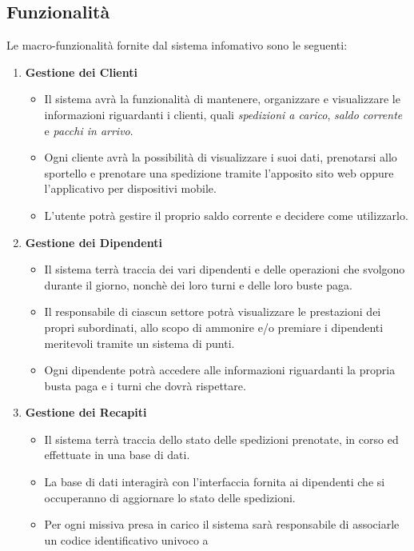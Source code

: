 \documentclass[a4paper,12pt]{article}
\begin{document}
\subsection{Funzionalità}
Le macro-funzionalità fornite dal sistema infomativo sono le seguenti:
\begin{enumerate}
	\item \textbf{Gestione dei Clienti} \begin{itemize}
		      \item Il sistema avrà la funzionalità di mantenere, organizzare e visualizzare le informazioni riguardanti i clienti, 
            quali \textit{spedizioni a carico}, \textit{saldo corrente} e \textit{pacchi in arrivo}.
		      \item Ogni cliente avrà la possibilità di visualizzare i suoi dati, prenotarsi allo sportello e prenotare una spedizione 
            tramite l'apposito sito web oppure l'applicativo per dispositivi mobile.
		      \item L'utente potrà gestire il proprio saldo corrente e decidere come utilizzarlo.
	      \end{itemize}
	\item \textbf{Gestione dei Dipendenti} \begin{itemize}
		      \item Il sistema terrà traccia dei vari dipendenti e delle operazioni che svolgono durante il giorno, nonchè dei loro 
            turni e delle loro buste paga.
		      \item Il responsabile di ciascun settore potrà visualizzare le prestazioni dei propri subordinati, allo scopo di 
            ammonire e/o premiare i dipendenti meritevoli tramite un sistema di punti.
		      \item Ogni dipendente potrà accedere alle informazioni riguardanti la propria busta paga e i turni che dovrà rispettare.
	      \end{itemize}
	\item \textbf{Gestione dei Recapiti} \begin{itemize}
		      \item Il sistema terrà traccia dello stato delle spedizioni prenotate, in corso ed effettuate in una base di dati.
		      \item La base di dati interagirà con l'interfaccia fornita ai dipendenti che si occuperanno di aggiornare lo stato 
            delle spedizioni.
		      \item Per ogni missiva presa in carico il sistema sarà responsabile di associarle un codice identificativo univoco a 

\end{itemize}
\end{enumerate}
\end{document}
